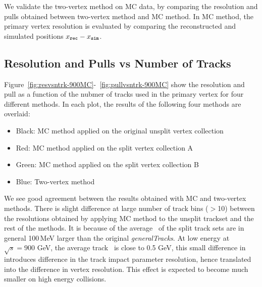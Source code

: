 
We validate the two-vertex method on MC data, 
by comparing the resolution and pulls obtained between 
two-vertex method and MC method. 
In MC method, the primary vertex resolution is evaluated by 
comparing the reconstructed and simulated positions 
$x_{\tt rec}-x_{\tt sim}$. 

\subsection{Resolution and Pulls vs Number of Tracks}
\label{sub:mcrespull}

Figure~\ref{fig:resvsntrk-900MC}-~\ref{fig:pullvsntrk-900MC} show 
the resolution and pull as a function of the nubmer of tracks used 
in the primary vertex for four different methods. 
In each plot, the results of the following four methods are overlaid:
\begin{itemize}
\item Black: MC method applied on the original unsplit vertex collection
\item Red: MC method applied on the split vertex collection A
\item Green: MC method applied on the split vertex collection B
\item Blue: Two-vertex method
\end{itemize}

We see good agreement between the results obtained with MC and 
two-vertex methods. There is slight difference at large number of 
track bins ($>$10) between the resolutions obtained by applying MC method to 
the unsplit trackset and the rest of the methods. 
It is because of the average \pt\, of the split track sets are in general 
100\,MeV larger than the original {\it generalTracks}. 
At low energy at $\sqrt{s}=900$ GeV, the average track \pt\, is 
close to 0.5 GeV, this small difference in \pt\, introduces 
difference in the track impact parameter resolution, hence 
translated into the difference in vertex resolution. 
This effect is expected to become much smaller on high energy collisions. 

